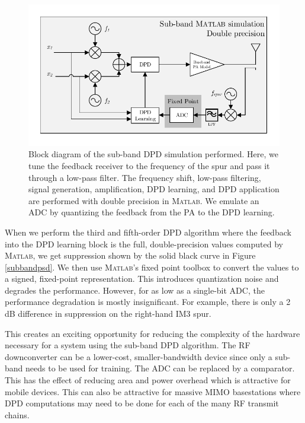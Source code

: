 \documentclass[conference]{IEEEtran}
\begin{document}
\begin{figure}[]
	\centering
	\includegraphics[width=\columnwidth]{SubBand}
	\caption{Block diagram of the sub-band DPD simulation performed. Here, we tune the feedback receiver to the frequency of the spur and pass it through a low-pass filter. The frequency shift, low-pass filtering, signal generation, amplification, DPD learning, and DPD application are performed with double precision in \textsc{Matlab}. We emulate an ADC by quantizing the feedback from the PA to the DPD learning.}
	\label{block2}
\end{figure}

 When we perform the third and fifth-order DPD algorithm where the feedback into the DPD learning block is the full, double-precision values computed by \textsc{Matlab}, we get suppression shown by the solid black curve in Figure \ref{subbandpsd}. We then use \textsc{Matlab}'s fixed point toolbox to convert the values to a signed, fixed-point representation. This introduces quantization noise and degrades the performance. 
 However, for as low as a single-bit ADC, the performance degradation is mostly insignificant. For example, there is only a 2 dB difference in suppression on the right-hand IM3 spur. 
 
 This creates an exciting opportunity for reducing the complexity of the hardware necessary for a system using the sub-band DPD algorithm. 
 The RF downconverter can be a lower-cost, smaller-bandwidth device since only a sub-band needs to be used for training.
 The ADC can be replaced by a comparator.
 This has the effect of reducing area and power overhead which is attractive for mobile devices. This can also be attractive for massive MIMO basestations where DPD computations may need to be done for each of the many RF transmit chains. 
 
\end{document}
